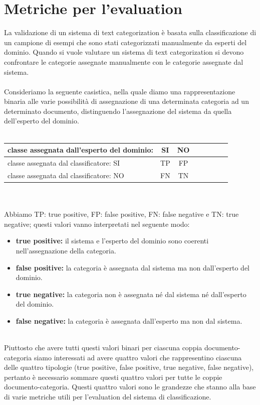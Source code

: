 \documentclass{article}
\theoremstyle{plain}
\theoremstyle{definition}
\begin{document}
\section{Metriche per l'evaluation}
La validazione di un sistema di text categorization è basata sulla classificazione di un campione di esempi che sono stati categorizzati manualmente da esperti del dominio. Quando si vuole valutare un sistema di text categorization si devono confrontare le categorie assegnate manualmente con le categorie assegnate dal sistema.
\\
\\
Consideriamo la seguente casistica, nella quale diamo una rappresentazione binaria alle varie possibilità di assegnazione di una determinata categoria ad un determinato documento, distinguendo l'assegnazione del sistema da quella dell'esperto del dominio.
\\
\\
\begin{tabular}{l*{6}{c}r}
classe assegnata dall'esperto del dominio:  & SI & NO \\
\hline
classe assegnata dal classificatore: SI & TP & FP \\
classe assegnata dal classificatore: NO & FN & TN \\
\end{tabular}
\\
\\
Abbiamo TP: true positive, FP: false positive, FN: false negative e TN: true negative; questi valori vanno interpretati nel seguente modo:
\begin{itemize}
\item \textbf{true positive:} il sistema e l'esperto del dominio sono coerenti nell'assegnazione della categoria.
\item \textbf{false positive:} la categoria è assegnata dal sistema ma non dall'esperto del dominio.
\item  \textbf{true negative:} la categoria non è assegnata né dal sistema né dall'esperto del dominio.
\item \textbf{false negative:} la categoria è assegnata dall'esperto ma non dal sistema.
\end{itemize}
\phantom
\\
Piuttosto che avere tutti questi valori binari per ciascuna coppia documento-categoria siamo interessati ad avere quattro valori che rappresentino ciascuna delle quattro tipologie (true positive, false positive, true negative, false negative), pertanto è necessario sommare questi quattro valori per tutte le coppie documento-categoria. Questi quattro valori sono le grandezze che stanno alla base di varie metriche utili per l'evaluation del sistema di classificazione.
\end{document}
